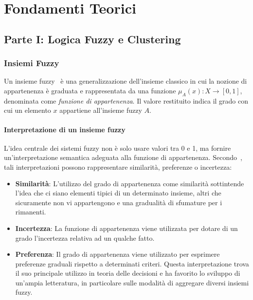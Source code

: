 \chapter{Fondamenti Teorici}
\label{chap:chap2}

\section{Parte I: Logica Fuzzy e Clustering}

\subsection{Insiemi Fuzzy}

Un insieme fuzzy~\cite{Goguen_1973} è una generalizzazione dell'insieme classico in cui la nozione di appartenenza è graduata e rappresentata da una funzione $\mu_A(x): X \rightarrow [0,1]$, denominata come \textit{funzione di appartenenza}. Il valore restituito indica il grado con cui un elemento $x$ appartiene all'insieme fuzzy $A$. 

\subsubsection{Interpretazione di un insieme fuzzy}

L’idea centrale dei sistemi fuzzy non è solo usare valori tra 0 e 1, ma fornire un’interpretazione semantica adeguata alla funzione di appartenenza. Secondo~\cite{DUBOIS1997141}, tali interpretazioni possono rappresentare similarità, preferenze o incertezza:
\begin{itemize}
    \item \textbf{Similarità}: L'utilizzo del grado di appartenenza come similarità sottintende l'idea che ci siano elementi tipici di un determinato insieme, altri che sicuramente non vi appartengono e una gradualità di sfumature per i rimanenti.
    \item \textbf{Incertezza}: La funzione di appartenenza viene utilizzata per dotare di un grado l'incertezza relativa ad un qualche fatto.
    \item \textbf{Preferenza}: Il grado di appartenenza viene utilizzato per esprimere preferenze graduali rispetto a determinati criteri. Questa interpretazione trova il suo principale utilizzo in teoria delle decisioni e ha favorito lo sviluppo di un'ampia letteratura, in particolare sulle modalità di aggregare diversi insiemi fuzzy.
\end{itemize}

